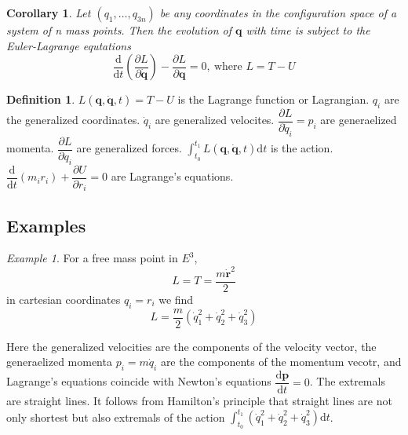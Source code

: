\documentclass[conference]{IEEEtran}
\newtheorem{corollary}{Corollary}
\theoremstyle{definition}
\newtheorem{definition}{Definition}[section]
\theoremstyle{remark}
\newtheorem{exmp}{Example}
\begin{document}
    \begin{corollary}
        Let $(q_1, \dots, q_{3n})$ be any coordinates in the configuration space of a system of n mass points. Then the evolution of $\mathbf{q}$  with time is subject to the Euler-Lagrange equtations
        \begin{equation*}
            \dfrac{\mathrm{d}}{\mathrm{d} t} \left( \dfrac{\partial L}{\partial \dot{\mathbf{q}}} \right) - \dfrac{\partial L}{\partial \mathbf{q}} = 0, \ \text{where } L = T - U
        \end{equation*}
    \end{corollary}

    \begin{definition}
        $L(\mathbf{q}, \dot{\mathbf{q}}, t) = T - U$ is the Lagrange function or Lagrangian. $q_i$ are the generalized coordinates. $\dot{q}_i$ are generalized velocites. $\dfrac{\partial L}{\partial \dot{q}_i} = p_i$ are generaelized momenta. $\dfrac{\partial L}{\partial q_i}$ are generalized forces. $\int_{t_0}^{t_1} L(\mathbf{q}, \dot{\mathbf{q}}, t) \mathrm{d} t$ is the action. $\dfrac{\mathrm{d}}{\mathrm{d} t} (m_i r_i) + \dfrac{\partial U}{\partial r_i} = 0$ are Lagrange's equations.
    \end{definition}

    \subsection{Examples}
    \begin{exmp}
        For a free mass point in $E^3$,
        \begin{equation*}
            L = T = \dfrac{m\dot{\mathbf{r}}^2}{2}
        \end{equation*}
        in cartesian coordinates $q_i = r_i$ we find
        \begin{equation*}
            L = \dfrac{m}2 (\dot{q}_1^2 + \dot{q}_2^2 + \dot{q}_3^2)
        \end{equation*}

        Here the generalized velocities are the components of the velocity vector, the generaelized momenta $p_i = m\dot{q}_i$ are the components of the momentum vecotr, and Lagrange's equations coincide with Newton's equations $\dfrac{\mathrm{d} \mathbf{p}}{\mathrm{d} t} = 0$. The extremals are straight lines. It follows from Hamilton's principle that straight lines are not only shortest but also extremals of the action $\int_{t_0}^{t_1} (\dot{q}_1^2 + \dot{q}_2^2 + \dot{q}_3^2) \mathrm{d} t$.
    \end{exmp}
    
\end{document}
